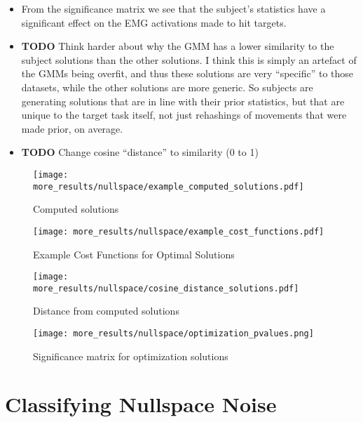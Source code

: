 \documentclass[../main.tex]{subfiles}
\begin{document}
\begin{itemize}
  \item From the significance matrix  we see that the subject's statistics have a significant effect on the EMG activations made to hit targets.
  \item \textbf{TODO} Think harder about why the GMM has a lower similarity to the subject solutions than the other solutions. I think this is simply an artefact of the GMMs being overfit, and thus these solutions are very ``specific'' to those datasets, while the other solutions are more generic. So subjects are generating solutions that are in line with their prior statistics, but that are unique to the target task itself, not just rehashings of movements that were made prior, on average.
  \item \textbf{TODO} Change cosine ``distance'' to similarity (0 to 1)
\end{itemize}


\begin{figure}[tph]
  \centering
    \texttt{[image: more\_results/nullspace/example\_computed\_solutions.pdf]}
    \caption[Computed solutions]{Computed solutions}\label{fig:computed_solutions}
\end{figure}

\begin{figure}[tph]
  \centering
    \texttt{[image: more\_results/nullspace/example\_cost\_functions.pdf]}
    \caption[Example Cost Functions for Optimal Solutions]{Example Cost Functions for Optimal Solutions}\label{fig:cost_functions}
\end{figure}

\begin{figure}[tph]
  \centering
    \texttt{[image: more\_results/nullspace/cosine\_distance\_solutions.pdf]}
    \caption[Distance from computed solutions]{Distance from computed solutions}\label{fig:computed_distances}
\end{figure}

\begin{figure}[tph]
  \centering
    \texttt{[image: more\_results/nullspace/optimization\_pvalues.png]}
    \caption[Significance matrix for optimization solutions]{Significance matrix for optimization solutions}\label{fig:optimization_pvalues}
\end{figure}




\section{Classifying Nullspace Noise}
\end{document}
